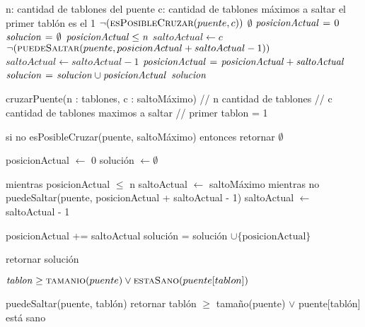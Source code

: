 \vspace*{0.5cm}


\begin{codebox}
\li \Comment n: cantidad de tablones del puente 
\li \Comment c: cantidad de tablones máximos a saltar 
\li \Comment el primer tablón es el 1
\li \If $\neg(\textnormal{\scshape esPosibleCruzar}(puente, c))$
\li     \Then 
            \Return $\emptyset$
        \End
\li $\id{posicionActual} \gets 0$
\li $\id{solucion} \gets \emptyset$
\li \While $\id{posicionActual} \leq \id{n}$
\li     \Do 
            $saltoActual \gets c$
        \End
\li     \While $\neg(\textnormal{\scshape puedeSaltar}(puente, posicionActual + saltoActual - 1))$
\li         \Do 
                $saltoActual \gets saltoActual - 1$
            \End
\li     $\id{posicionActual} \gets \id{posicionActual} + \id{saltoActual}$
\li     $\id{solucion} \gets \id{solucion} \cup \id{posicionActual}$
\li \Return $\id{solucion}$
\end{codebox}      



cruzarPuente(n : tablones, c : saltoMáximo)
  // n cantidad de tablones
  // c cantidad de tablones maximos a saltar
  // primer tablon = 1

  si no esPosibleCruzar(puente, saltoMáximo) entonces retornar $\emptyset$

  posicionActual $\gets$ 0
  solución $\gets \emptyset$

  mientras posicionActual $\leq$ n
    saltoActual $\gets$ saltoMáximo
    mientras no puedeSaltar(puente, posicionActual + saltoActual - 1)
      saltoActual $\gets$ saltoActual - 1

    posicionActual += saltoActual
    solución = solución $\cup \{\text{posicionActual}\}$

  retornar solución



\vspace*{0.5cm}



\begin{codebox}
    \Return $\id{tablon} \geq \proc{tamanio}(puente) \lor \proc{estaSano}(puente[tablon])$
\end{codebox}



puedeSaltar(puente, tablón)
  retornar tablón $\geq$ tamaño(puente) $\lor$ puente[tablón] está sano



